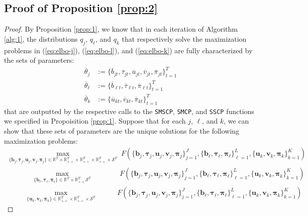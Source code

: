 \subsection{Proof of Proposition \ref{prop:2}}
\label{app:prop2-proof}

\begin{proof}
By Proposition \ref{prop:1}, we know that in each iteration of Algorithm \ref{alg:1}, the distributions $q_j$, $q_\ell$, and $q_k$ that respectively solve the maximization problems in (\ref{eq:elbo-j}), (\ref{eq:elbo-l}), and (\ref{eq:elbo-k}) are fully characterized by the sets of parameters:
\begin{align*}
    \overline{\theta}_j &:= \{\overline{b}_{jt}, \overline{\tau}_{jt}, \overline{u}_{jt}, \overline{v}_{jt}, \overline{\pi}_{jt}\}_{t=1}^T \\
    \overline{\theta}_\ell &:= \{\overline{b}_{\ell t}, \overline{\tau}_{\ell t}, \overline{\pi}_{\ell t}\}_{t=1}^T\\
    \overline{\theta}_k &:= \{\overline{u}_{kt}, \overline{v}_{kt}, \overline{\pi}_{kt}\}_{t=1}^T
\end{align*} 
that are outputted by the respective calls to the \texttt{SMSCP}, \texttt{SMCP}, and \texttt{SSCP} functions we specified in Propoisition \ref{prop:1}. Suppose that for each $j$, $\ell$, and $k$, we can show that these sets of parameters are the unique solutions for the following maximization problems: 
\begin{gather*}
    \max_{\{\mathbf{b}_j, \boldsymbol{\tau}_j, \mathbf{u}_j, \mathbf{v}_j, \boldsymbol{\pi}_j\} \in \mathbb{R}^T\times\mathbb{R}_{++}^T\times\mathbb{R}_{++}^T\times\mathbb{R}_{++}^T \times\mathcal{S}^T} \; F(\{\mathbf{b}_j, \boldsymbol{\tau}_j, \mathbf{u}_j, \mathbf{v}_j, \boldsymbol{\pi}_j\}_{j=1}^J, \{\mathbf{b}_\ell, \boldsymbol{\tau}_\ell, \boldsymbol{\pi}_\ell\}_{\ell=1}^L, \{\mathbf{u}_k, \mathbf{v}_k, \boldsymbol{\pi}_k\}_{k=1}^K) \\
    \;\;\quad\quad\quad\max_{\{\mathbf{b}_\ell, \boldsymbol{\tau}_\ell, \boldsymbol{\pi}_\ell\} \in \mathbb{R}^T\times\mathbb{R}_{++}^T\mathcal{S}^T} \;\quad\quad\quad\;\; F(\{\mathbf{b}_j, \boldsymbol{\tau}_j, \mathbf{u}_j, \mathbf{v}_j, \boldsymbol{\pi}_j\}_{j=1}^J, \{\mathbf{b}_\ell, \boldsymbol{\tau}_\ell, \boldsymbol{\pi}_\ell\}_{\ell=1}^L, \{\mathbf{u}_k, \mathbf{v}_k, \boldsymbol{\pi}_k\}_{k=1}^K) \\
    \;\;\quad\quad\max_{\{\mathbf{u}_k, \mathbf{v}_k, \boldsymbol{\pi}_k\} \in \mathbb{R}_{++}^T\times\mathbb{R}_{++}^T \times\mathcal{S}^T} \;\quad\quad\;\; F(\{\mathbf{b}_j, \boldsymbol{\tau}_j, \mathbf{u}_j, \mathbf{v}_j, \boldsymbol{\pi}_j\}_{j=1}^J, \{\mathbf{b}_\ell, \boldsymbol{\tau}_\ell, \boldsymbol{\pi}_\ell\}_{\ell=1}^L, \{\mathbf{u}_k, \mathbf{v}_k, \boldsymbol{\pi}_k\}_{k=1}^K) 

\end{gather*}
\end{proof}
